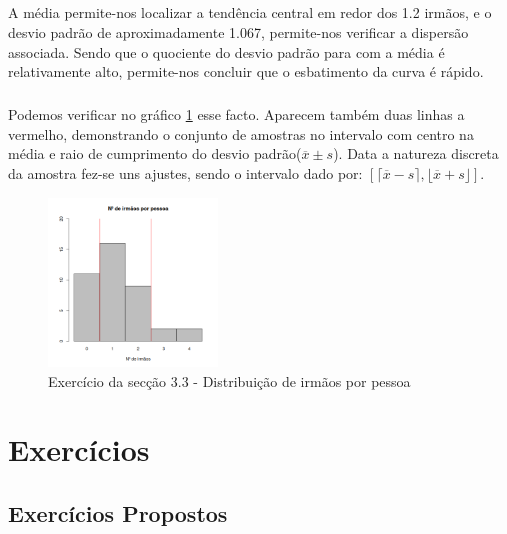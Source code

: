 \documentclass[11pt,a4paper]{report}
\begin{document}
\paragraph{} A média permite-nos localizar a tendência central em redor dos
1.2 irmãos, e o desvio padrão de aproximadamente 1.067, permite-nos verificar
a dispersão associada. Sendo que o quociente do desvio padrão para com a média
é relativamente alto, permite-nos concluir que o esbatimento da curva é
rápido.

\paragraph{} Podemos verificar no gráfico \ref{fig:ex3_3} esse facto. Aparecem
também duas linhas a vermelho, demonstrando o conjunto de amostras no
intervalo com centro na média e raio de cumprimento do desvio
padrão($\overline{x} \pm s$). Data a natureza discreta da amostra fez-se uns
ajustes, sendo o intervalo dado por:
$[\lceil \overline{x} - s \rceil, \lfloor \overline{x} + s \rfloor]$.

\vspace{0.5cm}




\begin{figure}[h!]
	\centering
	\includegraphics[width=0.4\textwidth]{./recursos/ex3_3.png}
	\caption{Exercício da secção 3.3 - Distribuição de irmãos por pessoa}
	\label{fig:ex3_3}
\end{figure}

\clearpage
\chapter{Exercícios}
\section*{Exercícios Propostos}
\end{document}
